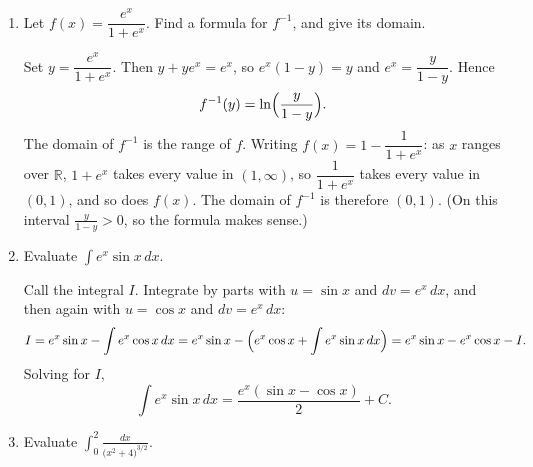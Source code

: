 \documentclass[12pt,letterpaper]{article}
\begin{document}
\begin{enumerate}[label=\textbf{\arabic*.},leftmargin=2em,itemsep=1.25em]
    \begin{solution}
      Let $x=3\sec\theta$ with $0\le\theta<\frac\pi2$. Then
      $dx=3\sec\theta\tan\theta\,d\theta$ and
      $\sqrt{x^2-9}=3\sqrt{\sec^2\theta-1}=3\tan\theta$, because
      $\tan\theta\ge0$. When $x=3$, $\theta=0$, and when $x=6$,
      $\sec\theta=2$, so $\theta=\frac\pi3$. Hence
      \begin{align*}
        \int_3^6\frac{\sqrt{x^2-9}}{x}\,dx
        &=\int_0^{\pi/3}\frac{3\tan\theta}{3\sec\theta}\cdot
          3\sec\theta\tan\theta\,d\theta
        =3\int_0^{\pi/3}\tan^2\theta\,d\theta\\
        &=3\int_0^{\pi/3}\bigl(\sec^2\theta-1\bigr)\,d\theta
        =3\Bigl[\tan\theta-\theta\Bigr]_0^{\pi/3}
        =3\sqrt3-\pi.
      \end{align*}
    \end{solution}

  \item Let $f(x)=\dfrac{e^x}{1+e^x}$. Find a formula for $f^{-1}$, and give
    its domain.

    \begin{solution}
      Set $y=\dfrac{e^x}{1+e^x}$. Then $y+ye^x=e^x$, so $e^x(1-y)=y$ and
      $e^x=\dfrac{y}{1-y}$. Hence
      \[
        f^{-1}(y)=\ln\Bigl(\frac{y}{1-y}\Bigr).
      \]
      The domain of $f^{-1}$ is the range of $f$. Writing
      $f(x)=1-\dfrac{1}{1+e^x}$: as $x$ ranges over $\mathbb R$, $1+e^x$
      takes every value in $(1,\infty)$, so $\dfrac1{1+e^x}$ takes every
      value in $(0,1)$, and so does $f(x)$. The domain of $f^{-1}$ is
      therefore $(0,1)$. (On this interval $\frac{y}{1-y}>0$, so the
      formula makes sense.)
    \end{solution}

  \item Evaluate $\displaystyle\int e^x\sin x\,dx$.

    \begin{solution}
      Call the integral $I$. Integrate by parts with $u=\sin x$ and
      $dv=e^x\,dx$, and then again with $u=\cos x$ and $dv=e^x\,dx$:
      \[
        I=e^x\sin x-\int e^x\cos x\,dx
         =e^x\sin x-\Bigl(e^x\cos x+\int e^x\sin x\,dx\Bigr)
         =e^x\sin x-e^x\cos x-I.
      \]
      Solving for $I$,
      \[
        \int e^x\sin x\,dx=\frac{e^x(\sin x-\cos x)}{2}+C.
      \]
    \end{solution}

  \item Evaluate $\displaystyle\int_0^2\frac{dx}{\bigl(x^2+4\bigr)^{3/2}}$.


\end{enumerate}
\end{document}
